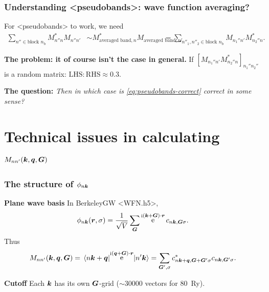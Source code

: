 \documentclass[t]{beamer}
\DeclareMathOperator{\ee}{e}
\DeclareMathOperator{\ii}{i}
\newcommand{\shortcode}[1]{\texttt{#1}}
\def\\{}%
\def\texttt#1{<#1>}%
\begin{document}
\begin{frame}
\frametitle{Understanding \shortcode{pseudobands}: wave function averaging?}

For \shortcode{pseudobands} to work, we need 
\begin{equation}
    \begin{aligned}
        \sum_{n'' \in \text{block $n_{\text{b}}$}} M_{n'' n}^* M_{n'' n'} 
        &\sim M_{\text{averaged band}, n}^* M_{\text{averaged band}, n'} \\
        &= \sum_{n''_1, n''_2 \in \text{block $n_{\text{b}}$}} M_{n_1'' n'} M_{n_2'' n}^*.
    \end{aligned}
    \label{eq:pseudobands-correct}
\end{equation}

\textbf{The problem: it of course isn't the case in general.}
If $[M_{n_1'' n'} M_{n_2'' n}^*]_{n_1'' n_2''}$ is a random matrix: 
$\text{LHS}:\text{RHS} \approx 0.3$.

\vspace{0.5cm}

\textbf{The question:} \emph{Then in which case is \eqref{eq:pseudobands-correct} correct in some sense?} 

\end{frame}

\section{Technical issues in calculating $M_{nn'}(\vb*{k}, \vb*{q}, \vb*{G})$}

\begin{frame}
\frametitle{The structure of $\phi_{n \vb*{k}}$}

\textbf{Plane wave basis} In BerkeleyGW \shortcode{WFN.h5}, 
\begin{equation}
    \phi_{n \vb*{k}}(\vb*{r}, \sigma) = \frac{1}{\sqrt{V}} \sum_{\vb*{G}} \ee^{\ii (\vb*{k} + \vb*{G}) \cdot \vb*{r}} c_{n \vb*{k}, \vb*{G} \sigma}.
\end{equation}    
Thus 
\begin{equation}
    M_{nn'}(\vb*{k}, \vb*{q}, \vb*{G}) 
    = \mel*{n \vb*{k} + \vb*{q}}{\ee^{\ii (\vb*{q} + \vb*{G}) \cdot \vb*{r}}}{n' \vb*{k}} 
    = \sum_{\vb*{G}', \sigma} c^*_{n \vb*{k} + \vb*{q}, \vb*{G} + \vb*{G}' \sigma} c_{n \vb*{k}, \vb*{G}' \sigma}.
\end{equation}

\textbf{Cutoff} Each $\vb*{k}$ has its own $\vb*{G}$-grid ($\sim 30000$ vectors for \SI{80}{Ry}).

\end{frame}
\end{document}

